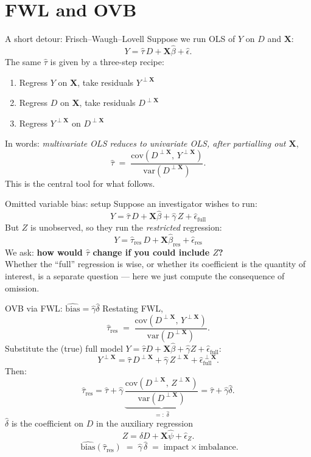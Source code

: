 \documentclass[xcolor=dvipsnames]{beamer}
\newcommand\X{{\bm X}}
\begin{document}
\section{FWL and OVB}

\begin{frame}{A short detour: Frisch--Waugh--Lovell}
\small
{} Suppose we run OLS of $Y$ on $D$ and $\X$:
\[
Y = \hat{\tau}\,D + \X\hat{\beta} + \hat{\epsilon}.
\]
 The same $\hat{\tau}$ is given by a three-step recipe:
\begin{enumerate}
\item Regress $Y$ on $\X$, take residuals $Y^{\perp \X}$
\item Regress $D$ on $\X$, take residuals $D^{\perp \X}$
\item Regress $Y^{\perp \X}$ on $D^{\perp \X}$
\end{enumerate}
 In words: \emph{multivariate OLS reduces to univariate OLS, after partialling out $\X$},
\[
\hat{\tau} \;=\; \frac{\text{cov}(D^{\perp \X},\, Y^{\perp \X})}{\text{var}(D^{\perp \X})}.
\]
 This is the central tool for what follows.
\end{frame}


\begin{frame}{Omitted variable bias: setup}
\small
{} Suppose an investigator wishes to run:
\[
Y = \hat{\tau}\, D + \X \hat{\beta} + \hat{\gamma}\, Z + \hat{\epsilon}_{\text{full}}
\]
 But $Z$ is unobserved, so they run the \emph{restricted} regression:
\[
Y = \hat{\tau}_{\text{res}}\, D + \X \hat{\beta}_{\text{res}} + \hat{\epsilon}_{\text{res}}
\]
\medskip
{} We ask: \textbf{how would $\hat{\tau}$ change if you could include $Z$?}\\
\medskip
{} Whether the ``full'' regression is wise, or whether its coefficient is the quantity of interest, is a separate question --- here we just compute the consequence of omission.
\end{frame}


\begin{frame}{OVB via FWL: $\widehat{\text{bias}} = \hat{\gamma}\hat{\delta}$}
\small
{} Restating FWL,
\[
\hat{\tau}_{\text{res}} \;=\; \frac{\text{cov}(D^{\perp \X},\, Y^{\perp \X})}{\text{var}(D^{\perp \X})}.
\]
 Substitute the (true) full model $Y = \hat{\tau} D + \X\hat{\beta} + \hat{\gamma} Z + \hat{\epsilon}_{\text{full}}$:
\[
Y^{\perp \X} = \hat{\tau}\, D^{\perp \X} + \hat{\gamma}\, Z^{\perp \X} + \hat{\epsilon}_{\text{full}}^{\perp \X}.
\]
 Then:
\[
\hat{\tau}_{\text{res}}
= \hat{\tau} + \hat{\gamma}\, \underbrace{\frac{\text{cov}(D^{\perp \X},\, Z^{\perp \X})}{\text{var}(D^{\perp \X})}}_{=:\;\hat{\delta}}
= \hat{\tau} + \hat{\gamma}\hat{\delta}.
\]
 $\hat{\delta}$ is the coefficient on $D$ in the auxiliary regression
\[
Z = \hat{\delta} D + \X\hat{\psi} + \hat{\epsilon}_Z.
\]
\[
\boxed{\;\widehat{\text{bias}}(\hat{\tau}_{\text{res}}) \;=\; \hat{\gamma}\,\hat{\delta} \;=\; \text{impact}\times\text{imbalance}.}
\]
\end{frame}
\end{document}
